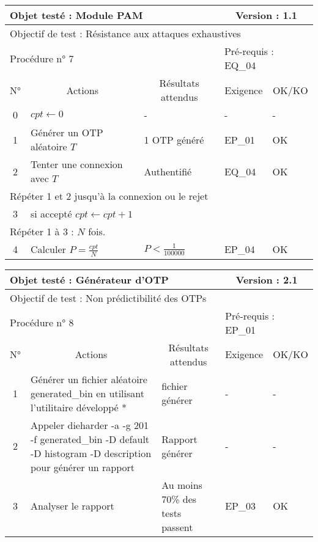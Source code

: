 \documentclass{"../../res/univ-projet"}
\begin{document}
\begin{center}
    \vskip 2.2cm 
    \begin{tabular}{|c|p{5cm}|p{5cm}|p{1.5cm}|p{1.5cm}|}
      \hline
      \multicolumn{3}{|l|}{Objet testé : Module PAM} & \multicolumn{2}{c|}{Version : 1.1}\\ \hline
      \multicolumn{5}{|l|}{Objectif de test : Résistance aux attaques exhaustives}\\ \hline
      \multicolumn{3}{|l|}{Procédure n° 7} & \multicolumn{2}{p{3cm}|}{Pré-requis : EQ\_04 }\\ \hline
      \multicolumn{1}{|c|}{N°} & \multicolumn{1}{c|}{Actions} & \multicolumn{1}{c|}{Résultats attendus} & 
      \multicolumn{1}{c|}{Exigence} & \multicolumn{1}{c|}{OK/KO}\\ \hline
      0 & $cpt \leftarrow 0$ & - & - & -\\
      1 & Générer un OTP aléatoire $T$ & 1 OTP généré & EP\_01 & OK\\
      2 & Tenter une connexion avec $T$ & Authentifié & EQ\_04 & OK \\ \hline      
      \multicolumn{5}{|l|}{Répéter 1 et 2 jusqu'à la connexion ou le rejet}\\
      \hline
      3 & si accepté $cpt \leftarrow cpt + 1$ & & & \\
      \hline
      \multicolumn{5}{|l|}{Répéter 1 à 3 : $N$ fois.}\\
      \hline
      4 & Calculer $P = \frac{cpt}{N}$ & $P < \frac{1}{100000}$ & EP\_04 & OK \\ \hline 
    \end{tabular}
    \vskip 2.2cm 
	\begin{tabular}{|c|p{5cm}|p{5cm}|p{1.5cm}|p{1.5cm}|}
      \hline
      \multicolumn{3}{|l|}{Objet testé : Générateur d'OTP} & \multicolumn{2}{c|}{Version : 2.1}\\ \hline
      \multicolumn{5}{|l|}{Objectif de test : Non prédictibilité des OTPs}\\ \hline
      \multicolumn{3}{|l|}{Procédure n° 8} & \multicolumn{2}{p{3cm}|}{Pré-requis : EP\_01 }\\ \hline
      \multicolumn{1}{|c|}{N°} & \multicolumn{1}{c|}{Actions} & \multicolumn{1}{c|}{Résultats attendus} & 
      \multicolumn{1}{c|}{Exigence} & \multicolumn{1}{c|}{OK/KO}\\ \hline
      1 & Générer un fichier aléatoire generated\_bin en utilisant l'utilitaire développé *& fichier générer & - & - \\
      2 & Appeler dieharder -a -g 201 -f generated\_bin -D default -D histogram -D description pour générer un rapport
      	& Rapport générer & - & - \\
      3 & Analyser le rapport & Au moins 70\% des tests passent & EP\_03 & OK \\
      \hline
    \end{tabular} 
    

\end{center}
\end{document}
